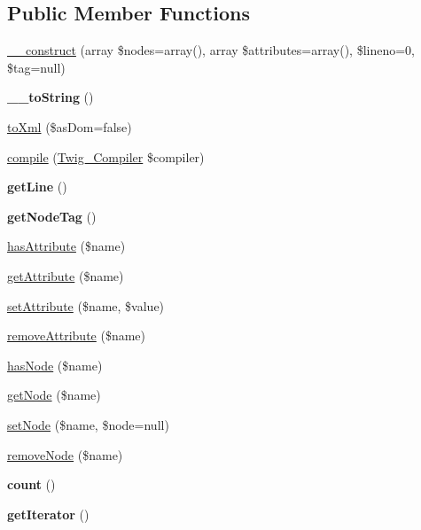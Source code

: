 \subsection*{Public Member Functions}
\begin{DoxyCompactItemize}
\item 
\hyperlink{classTwig__Node_a3521bc9d2ed1509d638537ded918b800}{\+\_\+\+\_\+construct} (array \$nodes=array(), array \$attributes=array(), \$lineno=0, \$tag=null)
\item 
{\bfseries \+\_\+\+\_\+to\+String} ()\hypertarget{classTwig__Node_ad71bb139ba5f0da82f59592baee8320e}{}\label{classTwig__Node_ad71bb139ba5f0da82f59592baee8320e}

\item 
\hyperlink{classTwig__Node_ae67364ef0be505ea43a05f6c80e1c7c6}{to\+Xml} (\$as\+Dom=false)
\item 
\hyperlink{classTwig__Node_a098d5e9aa1d2b215dd04ffe92d05022d}{compile} (\hyperlink{classTwig__Compiler}{Twig\+\_\+\+Compiler} \$compiler)
\item 
{\bfseries get\+Line} ()\hypertarget{classTwig__Node_aa7c2e7e561cf8682f1359cf2e8f05869}{}\label{classTwig__Node_aa7c2e7e561cf8682f1359cf2e8f05869}

\item 
{\bfseries get\+Node\+Tag} ()\hypertarget{classTwig__Node_adff30f20e848f56bd7ce4af0c7f32ed4}{}\label{classTwig__Node_adff30f20e848f56bd7ce4af0c7f32ed4}

\item 
\hyperlink{classTwig__Node_a211acc07d091741aab89b968f87099a7}{has\+Attribute} (\$name)
\item 
\hyperlink{classTwig__Node_a2e736f68e3699953123e34df287ed28c}{get\+Attribute} (\$name)
\item 
\hyperlink{classTwig__Node_a914379fcd779f96b13ac89fafd4f9981}{set\+Attribute} (\$name, \$value)
\item 
\hyperlink{classTwig__Node_a0825ce87e8af514ee07a5c100aa0afed}{remove\+Attribute} (\$name)
\item 
\hyperlink{classTwig__Node_a2ceaa8a2b21809b9413414543d393c08}{has\+Node} (\$name)
\item 
\hyperlink{classTwig__Node_a8e8e2c2b3a862576a65b068389cc7551}{get\+Node} (\$name)
\item 
\hyperlink{classTwig__Node_a02b13388b9e6cb3534daa6ba8279ed6f}{set\+Node} (\$name, \$node=null)
\item 
\hyperlink{classTwig__Node_a3d036ed47cf72dc23fa86c03c6fb9834}{remove\+Node} (\$name)
\item 
{\bfseries count} ()\hypertarget{classTwig__Node_aa33b2d66e9015abd8848f790406dacdc}{}\label{classTwig__Node_aa33b2d66e9015abd8848f790406dacdc}

\item 
{\bfseries get\+Iterator} ()\hypertarget{classTwig__Node_a02450c05f45410e24683b3b43893ba2f}{}\label{classTwig__Node_a02450c05f45410e24683b3b43893ba2f}

\end{DoxyCompactItemize}
